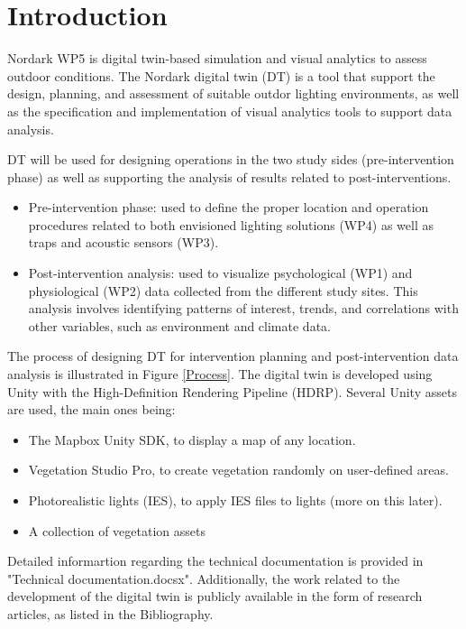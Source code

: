 \section{Introduction}

Nordark WP5 is digital twin-based simulation and visual analytics to assess outdoor conditions. The Nordark digital twin (DT) is a tool that support the design, planning, and assessment of suitable outdor lighting environments, as well as the specification and implementation of visual analytics tools to support data analysis. 

DT will be used for designing operations in the two study sides (pre-intervention phase) as well as supporting the analysis of results related to post-interventions. 
\begin{itemize}
    \item Pre-intervention phase: used to define the proper location and operation procedures related to both envisioned lighting solutions (WP4) as well as traps and acoustic sensors (WP3). 
    \item Post-intervention analysis: used to visualize psychological (WP1) and physiological (WP2) data collected from the different study sites. This analysis involves identifying patterns of interest, trends, and correlations with other variables, such as environment and climate data. 
\end{itemize}

The process of designing DT for intervention planning and post-intervention data analysis is illustrated in Figure \ref{Process}. The digital twin is developed using Unity with the High-Definition Rendering Pipeline (HDRP). Several Unity assets are used, the main ones being:
\begin{itemize}
    \item The Mapbox Unity SDK, to display a map of any location.
    \item Vegetation Studio Pro, to create vegetation randomly on user-defined areas.
    \item Photorealistic lights (IES), to apply IES files to lights (more on this later).
    \item A collection of vegetation assets
\end{itemize}
Detailed informartion regarding the technical documentation is provided in "Technical documentation.docsx". Additionally, the work related to the development of the digital twin is publicly available in the form of research articles, as listed in the Bibliography.


